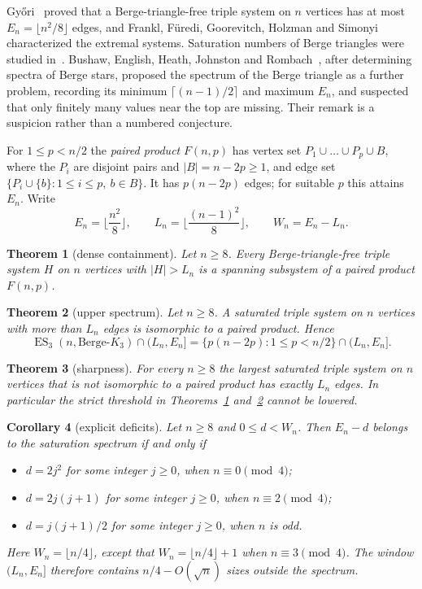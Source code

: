 \documentclass[11pt]{article}
\newtheorem{theorem}{Theorem}
\newtheorem{corollary}[theorem]{Corollary}
\theoremstyle{remark}
\newcommand{\F}{F}
\begin{document}
Gy\H{o}ri~\cite{Gyori} proved that a Berge-triangle-free triple system on
$n$ vertices has at most $E_n=\lfloor n^2/8\rfloor$ edges, and Frankl,
F\"uredi, Goorevitch, Holzman and Simonyi~\cite{FFGHS} characterized the
extremal systems. Saturation numbers of Berge triangles were studied
in~\cite{EGGMS}. Bushaw, English, Heath, Johnston and
Rombach~\cite[Section~6]{BEHJR}, after determining spectra of Berge stars,
proposed the spectrum of the Berge triangle as a further problem, recording
its minimum $\lceil (n-1)/2\rceil$ and maximum $E_n$, and suspected that
only finitely many values near the top are missing. Their
remark is a suspicion rather than a numbered conjecture.

For $1\le p<n/2$ the \emph{paired product} $\F(n,p)$ has vertex set
$P_1\cup\dots\cup P_p\cup B$, where the $P_i$ are disjoint pairs and
$|B|=n-2p\ge1$, and edge set $\{P_i\cup\{b\}:1\le i\le p,\ b\in B\}$. It has
$p(n-2p)$ edges; for suitable $p$ this attains $E_n$. Write
\[
E_n=\Big\lfloor\frac{n^2}{8}\Big\rfloor,\qquad
L_n=\Big\lfloor\frac{(n-1)^2}{8}\Big\rfloor,\qquad W_n=E_n-L_n .
\]

\begin{theorem}[dense containment]\label{thm:containment}
Let $n\ge8$. Every Berge-triangle-free triple system $H$ on $n$ vertices with
$|H|>L_n$ is a spanning subsystem of a paired product $\F(n,p)$.
\end{theorem}

\begin{theorem}[upper spectrum]\label{thm:spectrum}
Let $n\ge 8$. A saturated triple system on $n$ vertices with more than $L_n$
edges is isomorphic to a paired product. Hence
\[
\operatorname{ES}_3(n,\text{Berge-}K_3)\cap(L_n,E_n]
=\{p(n-2p):1\le p<n/2\}\cap(L_n,E_n].
\]
\end{theorem}

\begin{theorem}[sharpness]\label{thm:sharp}
For every $n\ge8$ the largest saturated triple system on $n$ vertices that
is not isomorphic to a paired product has exactly $L_n$ edges. In
particular the strict threshold in Theorems~\ref{thm:containment}
and~\ref{thm:spectrum} cannot be lowered.
\end{theorem}

\begin{corollary}[explicit deficits]\label{cor:deficits}
Let $n\ge8$ and $0\le d<W_n$. Then $E_n-d$ belongs to the saturation
spectrum if and only if
\begin{itemize}
\item $d=2j^2$ for some integer $j\ge0$, when $n\equiv0\pmod 4$;
\item $d=2j(j+1)$ for some integer $j\ge0$, when $n\equiv2\pmod 4$;
\item $d=j(j+1)/2$ for some integer $j\ge0$, when $n$ is odd.
\end{itemize}
Here $W_n=\lfloor n/4\rfloor$, except that $W_n=\lfloor n/4\rfloor+1$ when
$n\equiv3\pmod4$. The window $(L_n,E_n]$ therefore contains
$n/4-O(\sqrt n)$ sizes outside the spectrum.
\end{corollary}
\end{document}

